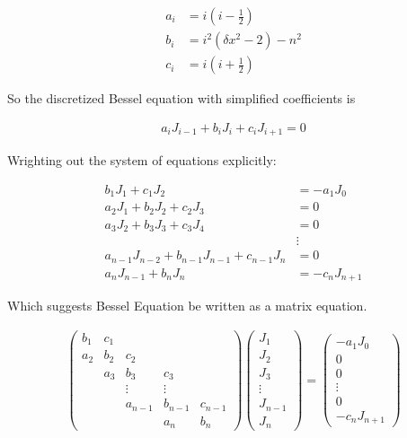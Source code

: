 \documentclass[onecolumn, groupedaddress, 10pt]{revtex4-1}
\begin{document}
\begin{align}
a_i &= i   \left( i - \frac{1}{2} \right)				\\
b_i &= i^2 \left( \delta x^2 - 2  \right) - n^2 		 	\\
c_i &= i   \left( i + \frac{1}{2} \right)
\end{align}

So the discretized Bessel equation with simplified coefficients is

\begin{align}
a_i J_{i-1} + b_i J_i + c_i J_{i+1} = 0
\end{align}

Wrighting out the system of equations explicitly:

\begin{align}
b_1 J_1 + c_1 J_2                                 &= - a_1 J_0		\\
a_2 J_1 + b_2 J_2 + c_2 J_3                       &= 0				\\
a_3 J_2 + b_3 J_3 + c_3 J_4                       &= 0				\\
                                                  &\vdots				\\
a_{n-1} J_{n-2} + b_{n-1} J_{n-1} + c_{n-1} J_{n} &=   0				\\
a_n J_{n-1} + b_n J_n                             &= - c_n J_{n+1}
\end{align}

Which suggests Bessel Equation be written as a matrix equation.

\begin{align}
\left( \begin{array}{ccccc}
	b_1 & c_1 &         &         &         \\
	a_2 & b_2 &   c_2   &         &         \\
	    & a_3 &   b_3   &   c_3   &         \\
	    &     & \vdots  & \vdots  &         \\
	    &     & a_{n-1} & b_{n-1} & c_{n-1} \\
	    &     &         &   a_n   &   b_n
\end{array} \right)
\left( \begin{array}{c}
	  J_1   \\
	  J_2   \\
	  J_3   \\
	\vdots  \\
	J_{n-1} \\
	  J_n
\end{array} \right)
=
\left( \begin{array}{c}
	  - a_1 J_0   \\
	      0       \\
	      0       \\
	   \vdots     \\
	      0       \\
	- c_n J_{n+1}
\end{array} \right)
\end{align}
\end{document}
